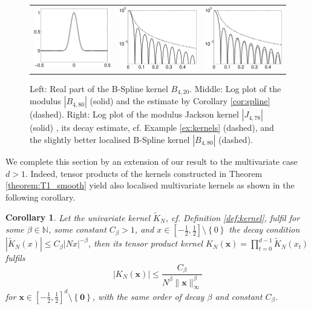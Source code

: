 \documentclass[11pt,a4paper,bibtotoc]{scrartcl}
\def\N{\mathbb{N}}
\newcommand{\zb}[1]{\ensuremath{\boldsymbol{#1}}}
\newtheorem{corollary}[theorem]{Corollary}
\newenvironment{Corollary}{\goodbreak \begin{corollary}\rm}{\end{corollary}}
\numberwithin{equation}{section}
\numberwithin{table}{section}
\numberwithin{figure}{section}
\begin{document}
\begin{figure}[ht]
  \begin{center}
    \begin{tabular}{ccc}
      \includegraphics[width=4cm]{images/polynomial_kernels3.eps} &
      \includegraphics[width=4cm]{images/polynomial_kernels5.eps} &
      \includegraphics[width=4cm]{images/polynomial_kernels6.eps}
    \end{tabular}
  \end{center}
  \caption{Left: Real part of the B-Spline kernel $B_{4,20}$.
    Middle: Log plot of the modulus $|B_{4,80}|$ (solid) and the estimate by
    Corollary \ref{cor:spline} (dashed).
    Right: Log plot of the modulus Jackson kernel $|J_{4,78}|$ (solid)
    , its decay 
    estimate, cf. Example \ref{ex:kernels} (dashed), and the slightly
    better localised 
    B-Spline kernel $|B_{4,80}|$ (dashed). \label{Fig:polykerne2}}
\end{figure}

We complete this section by an extension of our result to the multivariate
case $d>1$.
Indeed, tensor products of the kernels constructed in Theorem
\ref{theorem:T1_smooth} yield also localised multivariate kernels as shown in
the following corollary.

\begin{Corollary}\label{cor:tensorproduct}
  Let the univariate kernel $\tilde K_N$, cf. Definition
  \ref{def:kernel}, fulfil for some $\beta\in\N$, some constant $C_{\beta}>1$,
  and $x\in\left[-\frac{1}{2}, \frac{1}{2}\right]\setminus\left\{0\right\}$
  the decay condition $|\tilde K_N(x)| \le C_{\beta} |Nx|^{-\beta}$, then its
  tensor product kernel $K_N(\zb x)=\prod\limits_{t=0}^{d-1} \tilde K_N(x_t)$
  fulfils
  \begin{equation*}
    \left|K_N\left(\zb x\right)\right| \le \frac{C_{\beta}}
    {N^{\beta}\|\zb x\|_{\infty}^{\beta}}
  \end{equation*}
  for $\zb x\in\left[-\frac{1}{2}, \frac{1}{2}\right]^d\setminus\left\{\zb
  0\right\}$, with the same order of decay $\beta$ and constant $C_{\beta}$.
\end{Corollary}
\end{document}
